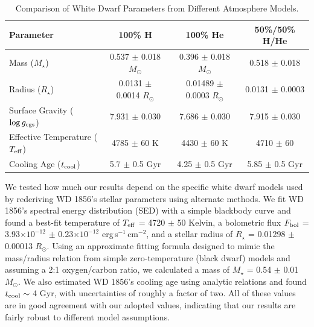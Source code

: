 \documentclass{nature3}
\newcommand{\rsun}{\ensuremath{R_\odot}}
\newcommand{\msun}{\ensuremath{M_\odot}}
\begin{document}
\begin{methods}
\begin{table}
\scriptsize
\centering
\caption{Comparison of White Dwarf Parameters from Different Atmosphere Models.} \label{modelcomparison}
\medskip
\begin{tabular}{lccc}
\hline
Parameter & 100\% H & 100\% He & 50\%/50\% H/He\\
\hline

Mass ($M_\star$)                        & 0.537 $\pm$ 0.018 \msun   & 0.396 $\pm$ 0.018 \msun    & 0.518 $\pm$ 0.018\\
Radius ($R_\star$)                      & 0.0131 $\pm$ 0.0014 \rsun & 0.01489 $\pm$ 0.0003 \rsun & 0.0131 $\pm$ 0.0003\\
Surface Gravity ($\log{g_{\rm cgs}}$)   & 7.931  $\pm$ 0.030        &  7.686 $\pm$ 0.030         & 7.915 $\pm$ 0.030\\
Effective Temperature ($T_{\rm eff}$)   & 4785 $\pm$ 60 K           & 4430 $\pm$ 60 K            & 4710 $\pm$ 60\\
Cooling Age ($t_{\rm cool}$)            & 5.7 $\pm$ 0.5 Gyr                   &4.25 $\pm$ 0.5  Gyr                    & 5.85  $\pm$ 0.5 Gyr\\


\hline
\end{tabular}
\end{table}



We tested how much our results depend on the specific white dwarf models used by rederiving WD 1856's stellar parameters using alternate methods. We fit\cite{stassun2018} WD 1856's spectral energy distribution (SED) with a simple blackbody curve and found a best-fit temperature of  $T_{\rm{eff}}$ = 4720 $\pm$ 50 Kelvin, a bolometric flux $F_{\rm bol}$ = 3.93$\times 10^{-12}$ $\pm$ 0.23$\times 10^{-12}$ erg\,s$^{-1}$\,cm$^{-2}$, and a stellar radius of $R_\star$ = 0.01298 $\pm$ 0.00013 \rsun. Using an approximate fitting formula\cite{eggletonbook} designed to mimic the mass/radius relation from simple zero-temperature (black dwarf) models\cite{zapolsky} and assuming a 2:1 oxygen/carbon ratio, we calculated a mass of $M_\star$ = 0.54 $\pm$ 0.01 \msun. We also estimated WD 1856's cooling age using analytic relations\cite{mestel} and found $t_{\rm cool} \sim$ 4 Gyr, with uncertainties of roughly a factor of two\cite{vanhorn}. All of these values are in good agreement with our adopted values, indicating that our results are fairly robust to different model assumptions.  



\end{methods}
\end{document}
